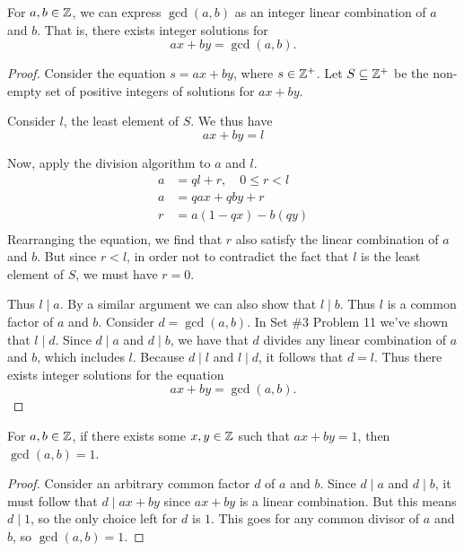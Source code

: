 \begin{theorem**}
    For $a, b \in \mathbb{Z}$, we can express $\gcd(a, b)$ as an integer linear combination of $a$ and $b$. That is, there exists integer solutions for
    \begin{equation*}
        ax+by=\gcd(a, b) .
    \end{equation*}
\end{theorem**}
\begin{proof}
    Consider the equation $s = ax+by$, where $s\in \mathbb{Z}^{+}$. Let $S \subseteq \mathbb{Z}^{+}$ be the non-empty set of positive integers of solutions for $ax + by$.

    Consider $l$, the least element of $S$. We thus have
    \begin{equation*}
        ax+by = l
    \end{equation*}

    Now, apply the division algorithm to $a$ and $l$.
    \begin{align*}
        a &= ql + r, \quad 0\leq r < l \\
        a &= qax + qby + r \\
        r &= a(1-qx) - b(qy) \\
    \end{align*}
    Rearranging the equation, we find that $r$ also satisfy the linear combination of $a$ and $b$. But since $r < l$, in order not to contradict the fact that $l$ is the least element of $S$, we must have $r = 0$.

    Thus $l \mid a$. By a similar argument we can also show that $l \mid b$. Thus $l$ is a common factor of $a$ and $b$. Consider $d = \gcd(a, b)$. In Set \#3 Problem 11 we've shown that $l \mid d$. Since $d \mid a$ and $d \mid b$, we have that $d$ divides any linear combination of $a$ and $b$, which includes $l$. Because $d \mid l$ and $l \mid d$, it follows that $d = l$. Thus there exists integer solutions for the equation
    \begin{equation*}
        ax+by = \gcd(a, b) .
    \end{equation*}
\end{proof}

\begin{theorem**}
    For $a, b \in \mathbb{Z}$, if there exists some $x, y\in \mathbb{Z}$ such that $ax+by=1$, then $\gcd(a,b)=1$.
\end{theorem**}

\begin{proof}
    Consider an arbitrary common factor $d$ of $a$ and $b$. Since $d\mid a$ and $d\mid b$, it must follow that $d\mid ax+by$ since $ax+by$ is a linear combination. But this means $d \mid 1$, so the only choice left for $d$ is $1$. This goes for any common divisor of $a$ and $b$, so $\gcd(a,b)=1$.
\end{proof}

